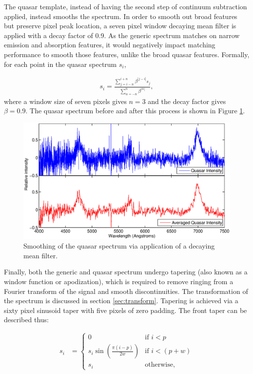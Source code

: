 \documentclass[titlesmallcaps, examinerscopy, copyrightpage]{uqthesis}
\newcommand{\brac}[1]{\left( #1 \right)}
\newcommand\abs[1]{\left|#1\right|}
\begin{document}
The quasar template, instead of having the second step of continuum subtraction applied, instead smooths the spectrum. In order to smooth out broad features but preserve pixel peak location, a seven pixel window decaying mean filter is applied with a decay factor of 0.9. As the generic spectrum matches on narrow emission and absorption features, it would negatively impact matching performance to smooth those features, unlike the broad quasar features. Formally, for each point in the quasar spectrum $s_i$, 

\begin{align}
s_i = \frac{\sum\limits_{j = i -n}^{i+n} \beta^{\abs{j-i}} s_j}{\sum\limits_{\alpha=-n}^n \beta^{\abs{\alpha}}},
\end{align}
where a window size of seven pixels gives $n=3$ and the decay factor gives $\beta = 0.9$. The quasar spectrum before and after this process is shown in Figure \ref{fig:quasar}.

\begin{figure}[ht!]
\includegraphics[width=1\textwidth]{images/quasarAverage.eps} 
\centering
\caption{Smoothing of the quasar spectrum via application of a decaying mean filter.}
\label{fig:quasar}
\end{figure}


Finally, both the generic and quasar spectrum undergo tapering (also known as a window function or apodization), which is required to remove ringing from a Fourier transform  of the signal and smooth discontinuities. The transformation of the spectrum is discussed in section \ref{sec:transform}. Tapering is achieved via a sixty pixel sinusoid taper with five pixels of zero padding. The front taper can be described thus:


\begin{align}
s_i &= 
\begin{cases}
	0 & \text{if } i < p \\
	s_i \sin\brac{\frac{\pi (i-p)}{2w}} & \text{if } i < (p+w) \\
	s_i & \text{otherwise},
\end{cases}
\end{align} 
\end{document}
